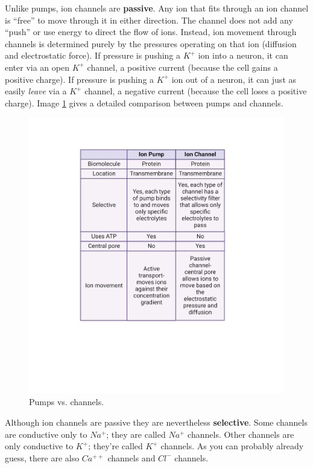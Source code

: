 \documentclass[
]{book}
\begin{document}
Unlike pumps, ion channels are \textbf{passive}. Any ion that fits through an ion channel is ``free'' to move through it in either direction. The channel does not add any ``push'' or use energy to direct the flow of ions. Instead, ion movement through channels is determined purely by the pressures operating on that ion (diffusion and electrostatic force). If pressure is pushing a \(K^+\) ion into a neuron, it can enter via an open \(K^+\) channel, a positive current (because the cell gains a positive charge). If pressure is pushing a \(K^+\) ion out of a neuron, it can just as easily \emph{leave} via a \(K^+\) channel, a negative current (because the cell loses a positive charge). Image \ref{fig:pumps-vs-channels-table} gives a detailed comparison between pumps and channels.

\begin{figure}

{\centering \includegraphics[width=0.9\linewidth]{images/ch02/table_02_01} 

}

\caption{Pumps vs. channels.}\label{fig:pumps-vs-channels-table}
\end{figure}

Although ion channels are passive they are nevertheless \textbf{selective}. Some channels are conductive only to \(Na^+\); they are called \(Na^+\) channels. Other channels are only conductive to \(K^+\); they're called \(K^+\) channels. As you can probably already guess, there are also \(Ca^{++}\) channels and \(Cl^{-}\) channels.
\end{document}
